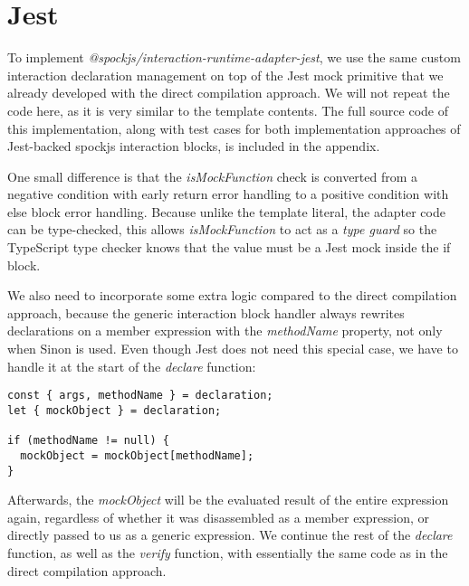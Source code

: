 \section{Jest}
To implement \textit{@spockjs/interaction-runtime-adapter-jest},
we use the same custom interaction declaration management
on top of the Jest mock primitive
that we already developed with the direct compilation approach.
We will not repeat the code here,
as it is very similar to the template contents.
The full source code of this implementation,
along with test cases for both implementation approaches
of Jest-backed spockjs interaction blocks,
is included in the appendix.

One small difference is that the \textit{isMockFunction} check
is converted from a negative condition with early return error handling
to a positive condition with else block error handling.
Because unlike the template literal, the adapter code can be type-checked,
this allows \textit{isMockFunction} to act as a \textit{type guard}
so the TypeScript type checker knows that
the value must be a Jest mock inside the if block.

We also need to incorporate some extra logic
compared to the direct compilation approach,
because the generic interaction block handler
always rewrites declarations on a member expression
with the \textit{methodName} property,
not only when Sinon is used.
Even though Jest does not need this special case,
we have to handle it at the start of the \textit{declare} function:
\begin{verbatim}
const { args, methodName } = declaration;
let { mockObject } = declaration;

if (methodName != null) {
  mockObject = mockObject[methodName];
}
\end{verbatim}
Afterwards, the \textit{mockObject} will be
the evaluated result of the entire expression again,
regardless of whether it was disassembled as a member expression,
or directly passed to us as a generic expression.
We continue the rest of the \textit{declare} function,
as well as the \textit{verify} function,
with essentially the same code as in the direct compilation approach.
